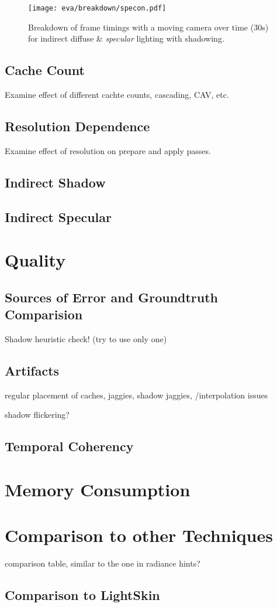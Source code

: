 \documentclass[thesis.tex]{subfiles}
\begin{document}
\begin{figure}
\centering
\texttt{[image: eva/breakdown/specon.pdf]}
\caption{Breakdown of frame timings with a moving camera over time (30s) for indirect diffuse \& \emph{specular} lighting with shadowing.}
\label{fig:frameratebreakdown:specon}
\end{figure}

\subsection{Cache Count}
Examine effect of different cachte counts, cascading, CAV, etc.

\subsection{Resolution Dependence}
Examine effect of resolution on prepare and apply passes.

\subsection{Indirect Shadow}


\subsection{Indirect Specular}

\newpage

\section{Quality}

\subsection{Sources of Error and Groundtruth Comparision}
Shadow heuristic check! (try to use only one)

\subsection{Artifacts}
regular placement of caches, jaggies,
shadow jaggies,
/interpolation issues

shadow flickering?

\subsection{Temporal Coherency}


\section{Memory Consumption}

\section{Comparison to other Techniques} \label{sec:eva:comparisiontoother}

comparison table, similar to the one in radiance hints?

\subsection{Comparison to LightSkin}

\subfilebib %
\end{document}
